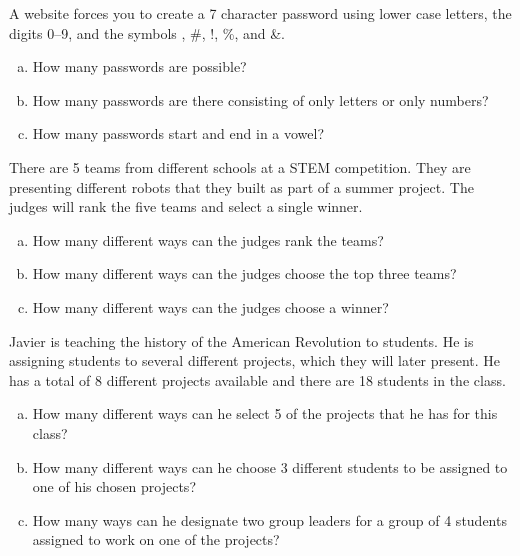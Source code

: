 \documentclass[11pt,letterpaper]{article}
\begin{document}

 A website forces you to create a 7 character password using lower case letters, the digits 0--9, and the symbols \@, \#, !, \%, and \&. 
	\begin{enumerate}[(a)]
	\item How many passwords are possible?
	\item How many passwords are there consisting of only letters or only numbers?
	\item How many passwords start and end in a vowel?
	\end{enumerate}



\newpage



 There are 5 teams from different schools at a STEM competition. They are presenting different robots that they built as part of a summer project. The judges will rank the five teams and select a single winner.
	\begin{enumerate}[(a)]
	\item How many different ways can the judges rank the teams?
	\item How many different ways can the judges choose the top three teams?
	\item How many different ways can the judges choose a winner?
	\end{enumerate}



\newpage



 Javier is teaching the history of the American Revolution to students. He is assigning students to several different projects, which they will later present. He has a total of 8 different projects available and there are 18 students in the class.
	\begin{enumerate}[(a)]
	\item How many different ways can he select 5 of the projects that he has for this class?
	\item How many different ways can he choose 3 different students to be assigned to one of his chosen projects?
	\item How many ways can he designate two group leaders for a group of 4 students assigned to work on one of the projects?
	\end{enumerate}
\end{document}
